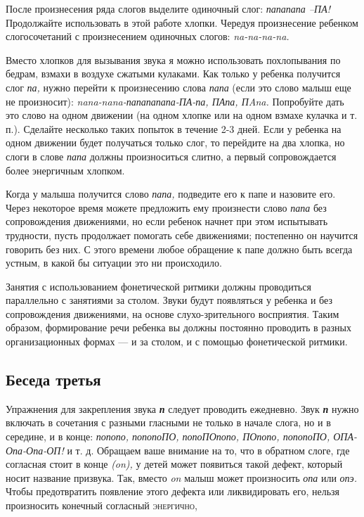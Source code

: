 \documentclass{book}
\renewcommand{\emph}[1]{\textit{#1}}
\begin{document}
После произнесения ряда слогов выделите одиночный слог: \emph{папапапа
--ПА!} Продолжайте использовать в этой работе хлопки. Чередуя
произнесение ребенком слогосочетаний с произнесением одиночных слогов:
\emph{na-na-na-na.}

Вместо хлопков для вызывания звука я можно использовать похлопывания по
бедрам, взмахи в воздухе сжатыми кулаками. Как только у ребенка
получится слог \emph{па,} нужно перейти к произнесению слова \emph{папа}
(если это слово малыш еще не произносит):
\emph{nana-nana-папапапапа-ПА-па, ПАпа, ПAna.} Попробуйте дать это слово
на одном движении (на одном хлопке или на одном взмахе кулачка и т. п.).
Сделайте несколько таких попыток в течение 2-3 дней. Если у ребенка на
одном движении будет получаться только слог, то перейдите на два хлопка,
но слоги в слове \emph{папа} должны произноситься слитно, а первый
сопровождается более энергичным хлопком.

Когда у малыша получится слово \emph{папа,} подведите его к папе и
назовите его. Через некоторое время можете предложить ему произнести
слово \emph{папа} без сопровождения движениями, но если ребенок начнет
при этом испытывать трудности, пусть продолжает помогать себе
движениями; постепенно он научится говорить без них. С этого времени
любое обращение к папе должно быть всегда устным, в какой бы ситуации
это ни происходило.

Занятия с использованием фонетической ритмики должны проводиться
параллельно с занятиями за столом. Звуки будут появляться у ребенка и
без сопровождения движениями, на основе слухо-зрительного восприятия.
Таким образом, формирование речи ребенка вы должны постоянно проводить в
разных организационных формах --- и за столом, и с помощью фонетической
ритмики.

\subsection*{Беседа третья}

Упражнения для закрепления звука \emph{\textbf{п}} следует проводить
ежедневно. Звук \emph{\textbf{п}} нужно включать в сочетания с разными
гласными не только в начале слога, но и в середине, и в конце:
\emph{попопо, попопоПО, попоПОпопо, ПОпопо, попопоПО, ОПА-Опа-Опа-ОП!} и
т. д. Обращаем ваше внимание на то, что в обратном слоге, где согласная
стоит в конце \emph{(on),} у детей может появиться такой дефект, который
носит название призвука. Так, вместо \emph{on} малыш может произносить
\emph{опа} или \emph{опэ.} Чтобы предотвратить появление этого дефекта
или ликвидировать его, нельзя произносить конечный согласный
\textsc{энергично,}
\end{document}
